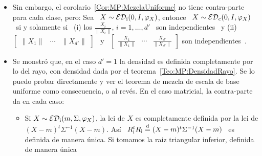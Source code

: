 \begin{itemize}
\begin{itemize}
    $\begin{bmatrix} U_{\col,1}^t &  \cdots & U_{\col,d'}^t \end{bmatrix}^t \sim
    \U\left( \Sset_{d  d'} \right)$ uniforme sobre la  esfera, independientes de
    $R_\col \ge 0$ escalar.
  \item $X \sim \ED_\bil(m,\Sigma,\Sigma',\varphi_X) \:\: \Leftrightarrow \:\: X
    \egald \Sigma^{\frac12}  U_\izq \Lambda  V_\der \Sigma'^{\frac12} +  m$ \:\:
    con  \:\: $U_\izq  \sim  \U\left( \Sti_{d,d'}(\Rset)  \right)$  \:\: y  \:\:
    $V_\der  \sim   \U\left(  \Sti_{d',d'}(\Rset)  \right)$,   independientes  e
    independiente    de   $\Lambda    \ge   0$    matriz    aleatoria   diagonal
    positiva. Pasando, aparece que $\diag(\Lambda^2) = \lambda(X^t X)$ vector de
    las autovalores de $X^t X$ (ver tambi\'en~\cite[Rep.~2]{Daw78}).
  \end{itemize}
  En   ambos   casos,    para   $d'   =   1$,   se    recupera   obviamente   el
  teorema~~\ref{Teo:MP:MezclaUniforme}.
%
\item   Sin   embargo,   el   corolario~\ref{Cor:MP:MezclaUniforme}   no   tiene
  contra-parte para  cada clase, pero:  Sea \ $X  \sim \mathcal{ED}_{\mathrm{i}}(0,I,\varphi_X)$,
  entonce  \ $X\sim  \mathcal{ED}_{\mathrm{c}}(0,I,\varphi_X)$  \ si  y  solamente si  \ (i)  los
  $\frac{X_i}{\| X_i \|}, \, i = 1, \ldots , d'$ \ son independientes \ y (ii) \
  $\begin{bmatrix}  \| X_1  \| &  \cdots &  \| X_{d'}  \| \end{bmatrix}$  \  y \
  $\begin{bmatrix}  \frac{X_1}{\| X_1  \|}  & \cdots  & \frac{X_{d'}}{\|  X_{d'}
      \|} \end{bmatrix}$ son independientes~\cite[Lema~6]{FanChe84}.
%
\item  Se  monstr\'o  que,  en  el  caso  $d'  =  1$  la  densidad  es  definida
  completamente    por   lo    del   rayo,    con   densidad    dada    por   el
  teorema~\ref{Teo:MP:DensidadRayo}. Se  lo puedo  probar directamente y  ver el
  teorema de mezcla de escala de  base uniforme como consecuencia, o al rev\'es.
  En el caso matricial, la contra-parte da en cada caso:
  \begin{itemize}
  \item Si $X \sim \mathcal{ED}_{\mathrm{i}}(m,\Sigma,\varphi_X)$, la lei de $X$ es completamente
    definida por la lei de $(X-m)^t \Sigma^{-1} (X-m)$. As\'i \ $R_{\mathrm{i}}^t R_{\mathrm{i}}
    \stackrel{\mathrm{d}}{=}  (X-m)^t \Sigma^{-1}  (X-m)$ \  es  definida de  manera \'unica.   Si
    tomamos   la  raiz   triangular   inferior,  definida   de  manera   \'unica

\end{itemize}
\end{itemize}
